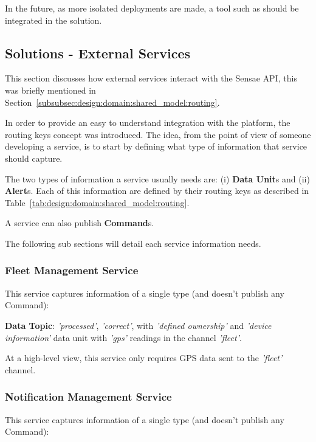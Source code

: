 In the future, as more isolated deployments are made, a tool such as  should be integrated in the solution.

\subsection{Solutions - External Services}
\label{subsec:implementation:description:services}

This section discusses how external services interact with the Sensae \gls{API}, this was briefly mentioned in Section~\ref{subsubsec:design:domain:shared_model:routing}.

In order to provide an easy to understand integration with the platform, the routing keys concept was introduced. The idea, from the point of view of someone developing a service, is to start by defining what type of information that service should capture.

The two types of information a service usually needs are: (i) \textbf{Data Unit}s and (ii) \textbf{Alert}s. Each of this information are defined by their routing keys as described in Table~\ref{tab:design:domain:shared_model:routing}.

A service can also publish \textbf{Command}s.

The following sub sections will detail each service information needs.

\subsubsection{Fleet Management Service}
\label{subsubsec:implementation:description:services:fleet}

This service captures information of a single type (and doesn't publish any Command):

\textbf{Data Topic}: \textit{'processed'}, \textit{'correct'}, with \textit{'defined ownership'} and \textit{'device information'} data unit with \textit{'gps'} readings in the channel \textit{'fleet'}.

At a high-level view, this service only requires \gls{GPS} data sent to the \textit{'fleet'} channel.

\subsubsection{Notification Management Service}
\label{subsubsec:implementation:description:services:notification}

This service captures information of a single type (and doesn't publish any Command):

